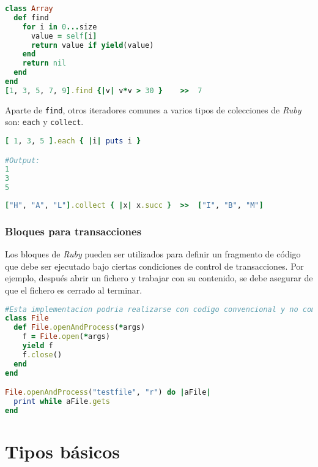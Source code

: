 \begin{lstlisting}[language=Ruby]
class Array
  def find
    for i in 0...size
      value = self[i]
      return value if yield(value)
    end
    return nil
  end
end
[1, 3, 5, 7, 9].find {|v| v*v > 30 }	>>	7
\end{lstlisting}

Aparte de \texttt{find}, otros iteradores comunes a varios tipos de colecciones de \textit{Ruby} son: \texttt{each} y \texttt{collect}.

\begin{lstlisting}[language=Ruby]
[ 1, 3, 5 ].each { |i| puts i }

#Output:
1
3
5
\end{lstlisting}

\begin{lstlisting}[language=Ruby]
["H", "A", "L"].collect { |x| x.succ }	>>	["I", "B", "M"]
\end{lstlisting}

\subsubsection{Bloques para transacciones}
Los bloques de \textit{Ruby} pueden ser utilizados para definir un fragmento de código que debe ser ejecutado bajo ciertas condiciones de control de transacciones. Por ejemplo, después abrir un fichero y trabajar con su contenido, se debe asegurar de que el fichero es cerrado al terminar.

\begin{lstlisting}[language=Ruby]
#Esta implementacion podria realizarse con codigo convencional y no comtempla el manejo de excepciones.
class File
  def File.openAndProcess(*args)
    f = File.open(*args)
    yield f
    f.close()
  end
end

File.openAndProcess("testfile", "r") do |aFile|
  print while aFile.gets
end
\end{lstlisting}

\section{Tipos básicos}
